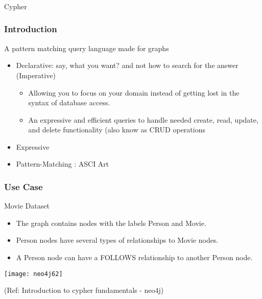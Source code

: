 \begin{frame}[fragile]\frametitle{}
\begin{center}
{\Large Cypher}
\end{center}
\end{frame}


\begin{frame}[fragile]\frametitle{Introduction}
A pattern matching query language made for graphs

\begin{itemize}
\item Declarative: say, what you want? and not how to search for the answer (Imperative)
\begin{itemize}
\item  Allowing you to focus on your domain instead of getting lost in the syntax of database access.
\item An expressive and efficient queries to handle needed create, read, update, and delete functionality (also know as CRUD operations
\end{itemize}
\item Expressive
\item Pattern-Matching : ASCI Art
\end{itemize}

\end{frame}

\begin{frame}[fragile]\frametitle{Use Case}

Movie Dataset

\begin{itemize}
\item The graph contains nodes with the labels Person and Movie. 
\item Person nodes have several types of relationships to Movie nodes. 
\item A Person node can have a FOLLOWS relationship to another Person node.
\end{itemize}


\begin{center}
\texttt{[image: neo4j62]}
\end{center}	  


{\tiny (Ref: Introduction to cypher fundamentals  - neo4j)}

\end{frame}

